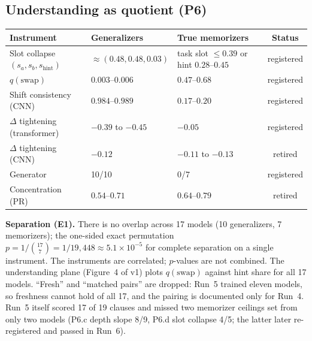 \documentclass[11pt]{article}
\begin{document}
\subsection{Understanding as quotient (P6)}
\begin{table}[h]\centering\small
\begin{tabular}{@{}lllc@{}}
\toprule
Instrument & Generalizers & True memorizers & Status\\\midrule
Slot collapse $(s_a,s_b,s_{\text{hint}})$ & $\approx(0.48,0.48,0.03)$ & task slot $\le0.39$ or hint $0.28$--$0.45$ & registered\\
$q(\text{swap})$ & $0.003$--$0.006$ & $0.47$--$0.68$ & registered\\
Shift consistency (CNN) & $0.984$--$0.989$ & $0.17$--$0.20$ & registered\\
$\Delta$ tightening (transformer) & $-0.39$ to $-0.45$ & $-0.05$ & registered\\
$\Delta$ tightening (CNN) & $-0.12$ & $-0.11$ to $-0.13$ & retired\\
Generator & 10/10 & 0/7 & registered\\
Concentration (PR) & $0.54$--$0.71$ & $0.64$--$0.79$ & retired\\\bottomrule
\end{tabular}
\end{table}
\textbf{Separation (E1).} There is no overlap across 17 models (10 generalizers, 7 memorizers); the one-sided exact permutation $p=1/\binom{17}{7}=1/19{,}448\approx5.1\times10^{-5}$ for complete separation on a single instrument. The instruments are correlated; $p$-values are not combined. The understanding plane (Figure~4 of v1) plots $q(\text{swap})$ against hint share for all 17 models. ``Fresh'' and ``matched pairs'' are dropped: Run~5 trained eleven models, so freshness cannot hold of all 17, and the pairing is documented only for Run~4.
Run~5 itself scored 17 of 19 clauses and missed two memorizer ceilings set from only two models (P6.c depth slope 8/9, P6.d slot collapse 4/5; the latter later re-registered and passed in Run~6).
\end{document}

